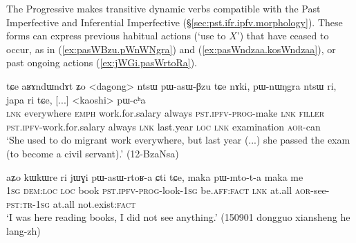 The Progressive makes transitive dynamic verbs compatible with the Past Imperfective and Inferential Imperfective (§\ref{sec:pst.ifr.ipfv.morphology}). These forms can express previous habitual actions (`use to $X$') that have ceased to occur, as in (\ref{ex:pasWBzu.pWnWNgra}) and (\ref{ex:pasWndzaa.kosWndzaa}), or past ongoing actions (\ref{ex:jWGi.pasWrtoRa}).

\begin{exe}
\ex \label{ex:pasWBzu.pWnWNgra}
\gll tɕe aʁɤndɯndɤt ʑo <dagong> ntsɯ pɯ-asɯ-βzu tɕe nɤki, pɯ-nɯŋgra ntsɯ ri, japa ri tɕe, [...] <kaoshi> pɯ-cʰa \\
\textsc{lnk} everywhere \textsc{emph} work.for.salary always \textsc{pst}.\textsc{ipfv}-\textsc{prog}-make \textsc{lnk} \textsc{filler} \textsc{pst}.\textsc{ipfv}-work.for.salary always \textsc{lnk} last.year \textsc{loc} \textsc{lnk} {  } examination \textsc{aor}-can \\
\glt `She used to do migrant work everywhere, but last year (...) she passed the exam (to become a civil servant).' (12-BzaNsa)
\end{exe}

\begin{exe}
\ex \label{ex:jWGi.pasWrtoRa}
\gll aʑo kɯkɯre ri jɯɣi pɯ-asɯ-rtoʁ-a ɕti tɕe, maka pɯ-mto-t-a maka me \\
\textsc{1sg} \textsc{dem}:\textsc{loc} \textsc{loc} book \textsc{pst}.\textsc{ipfv}-\textsc{prog}-look-\textsc{1sg} be.\textsc{aff}:\textsc{fact} \textsc{lnk} at.all \textsc{aor}-see-\textsc{pst}:\textsc{tr}-\textsc{1sg} at.all not.exist:\textsc{fact} \\
\glt `I was here reading books, I did not see anything.' (150901 dongguo xiansheng he lang-zh)
\end{exe}

